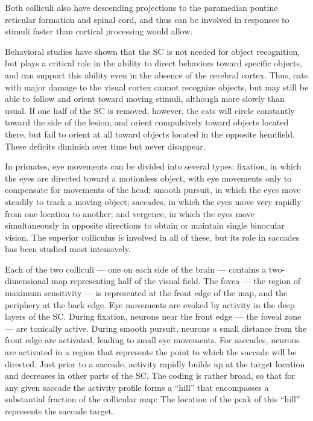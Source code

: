 \documentclass[]{book}
\begin{document}
Both colliculi also have descending projections to the paramedian pontine reticular formation and spinal cord, and thus can be involved in responses to stimuli faster than cortical processing would allow.

Behavioral studies have shown that the SC is not needed for object recognition, but plays a critical role in the ability to direct behaviors toward specific objects, and can support this ability even in the absence of the cerebral cortex. Thus, cats with major damage to the visual cortex cannot recognize objects, but may still be able to follow and orient toward moving stimuli, although more slowly than usual. If one half of the SC is removed, however, the cats will circle constantly toward the side of the lesion, and orient compulsively toward objects located there, but fail to orient at all toward objects located in the opposite hemifield. These deficits diminish over time but never disappear.

In primates, eye movements can be divided into several types: fixation, in which the eyes are directed toward a motionless object, with eye movements only to compensate for movements of the head; smooth pursuit, in which the eyes move steadily to track a moving object; saccades, in which the eyes move very rapidly from one location to another; and vergence, in which the eyes move simultaneously in opposite directions to obtain or maintain single binocular vision. The superior colliculus is involved in all of these, but its role in saccades has been studied most intensively.

Each of the two colliculi --- one on each side of the brain --- contains a two-dimensional map representing half of the visual field. The fovea --- the region of maximum sensitivity --- is represented at the front edge of the map, and the periphery at the back edge. Eye movements are evoked by activity in the deep layers of the SC. During fixation, neurons near the front edge --- the foveal zone --- are tonically active. During smooth pursuit, neurons a small distance from the front edge are activated, leading to small eye movements. For saccades, neurons are activated in a region that represents the point to which the saccade will be directed. Just prior to a saccade, activity rapidly builds up at the target location and decreases in other parts of the SC. The coding is rather broad, so that for any given saccade the activity profile forms a ``hill'' that encompasses a substantial fraction of the collicular map: The location of the peak of this ``hill'' represents the saccade target.
\end{document}
